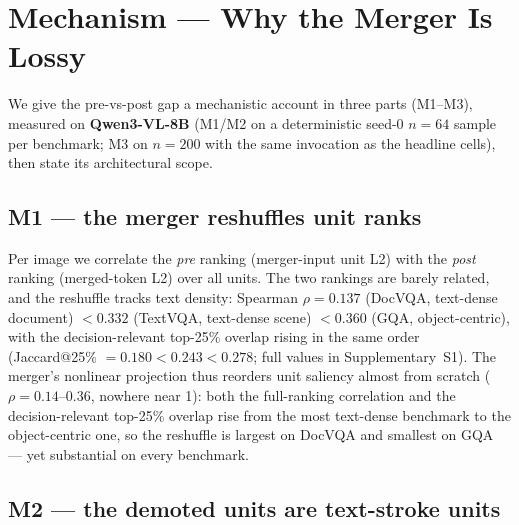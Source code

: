 \documentclass[journal]{IEEEtran}
\begin{document}
\section{Mechanism --- Why the Merger Is Lossy}\label{sec:mechanism}

We give the pre-vs-post gap a mechanistic account in three parts (M1--M3),
measured on \textbf{Qwen3-VL-8B} (M1/M2 on a deterministic seed-0 $n = 64$ sample
per benchmark; M3 on $n = 200$ with the same invocation as the headline cells),
then state its architectural scope.

\subsection{M1 --- the merger reshuffles unit ranks}\label{sec:m1}

Per image we correlate the \emph{pre} ranking (merger-input unit L2) with the
\emph{post} ranking (merged-token L2) over all units. The two rankings are
barely related, and the reshuffle tracks text density: Spearman
$\rho = \mathbf{0.137}$ (DocVQA, text-dense document) $< 0.332$ (TextVQA,
text-dense scene) $< \mathbf{0.360}$ (GQA, object-centric), with the
decision-relevant top-25\% overlap rising in the same order (Jaccard@25\%
$= 0.180 < 0.243 < 0.278$; full values in Supplementary~S1). The merger's
nonlinear projection thus reorders unit saliency almost from scratch
($\rho = 0.14$--$0.36$, nowhere near 1): both the full-ranking correlation and
the decision-relevant top-25\% overlap rise from the most text-dense benchmark
to the object-centric one, so the reshuffle is largest on DocVQA and smallest on
GQA --- yet substantial on every benchmark.

\subsection{M2 --- the demoted units are text-stroke units}\label{sec:m2}
\end{document}
